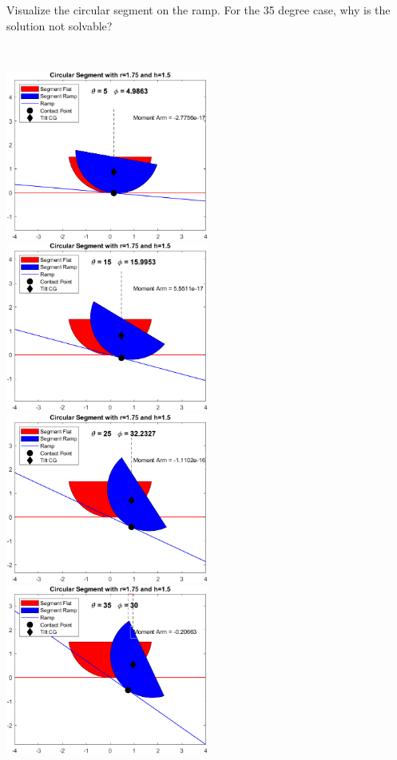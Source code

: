 Visualize the circular segment on the ramp. For the 35 degree case, why is the solution not solvable?

\begin{solution} \
\begin{center}
    \includegraphics[width=0.5\textwidth]{img/e6p2a.png}
    \includegraphics[width=0.5\textwidth]{img/e6p2b.png}
    \includegraphics[width=0.5\textwidth]{img/e6p2c.png}
    \includegraphics[width=0.5\textwidth]{img/e6p2d.png}

\end{center}
\end{solution}
